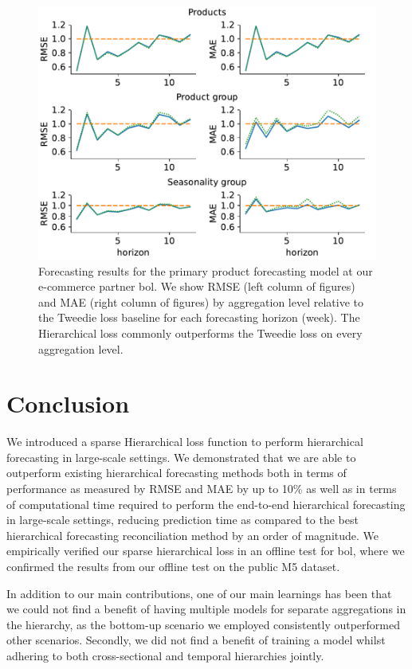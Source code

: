 \documentclass[preprint, 3p, times, twocolumn]{elsarticle}
\begin{document}
  \begin{figure}[t] 
    \includegraphics[width=\columnwidth, keepaspectratio]{assets/bol_levels.pdf}
    \caption{Forecasting results for the primary product forecasting model at our e-commerce partner bol. We show RMSE (left column of figures) and MAE (right column of figures) by aggregation level relative to the Tweedie loss baseline for each forecasting horizon (week). The Hierarchical loss commonly outperforms the Tweedie loss on every aggregation level.}
    \label{fig:bol_level_results}
  \end{figure}


\section{Conclusion} \label{sec:conclusion}
  We introduced a sparse Hierarchical loss function to perform hierarchical forecasting in large-scale settings. We demonstrated that we are able to outperform existing hierarchical forecasting methods both in terms of performance as measured by RMSE and MAE by up to 10\% as well as in terms of computational time required to perform the end-to-end hierarchical forecasting in large-scale settings, reducing prediction time as compared to the best hierarchical forecasting reconciliation method by an order of magnitude. We empirically verified our sparse hierarchical loss in an offline test for bol, where we confirmed the results from our offline test on the public M5 dataset. 

  In addition to our main contributions, one of our main learnings has been that we could not find a benefit of having multiple models for separate aggregations in the hierarchy, as the bottom-up scenario we employed consistently outperformed other scenarios. Secondly, we did not find a benefit of training a model whilst adhering to both cross-sectional and temporal hierarchies jointly. 
\end{document}
